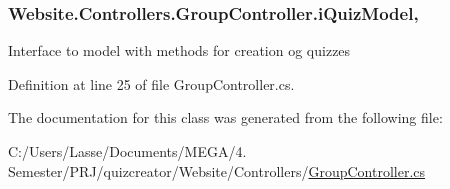 \subsubsection[{i\+Quiz\+Model}]{ Website.\+Controllers.\+Group\+Controller.\+i\+Quiz\+Model\hspace{0.3cm}{\ttfamily [get]}, {\ttfamily [set]}}\label{class_website_1_1_controllers_1_1_group_controller_a0df206ca548f0760256dd5ccb053f42d}


Interface to model with methods for creation og quizzes 



Definition at line 25 of file Group\+Controller.\+cs.



The documentation for this class was generated from the following file\+:\begin{DoxyCompactItemize}
\item 
C\+:/\+Users/\+Lasse/\+Documents/\+M\+E\+G\+A/4. Semester/\+P\+R\+J/quizcreator/\+Website/\+Controllers/\hyperlink{_group_controller_8cs}{Group\+Controller.\+cs}\end{DoxyCompactItemize}
